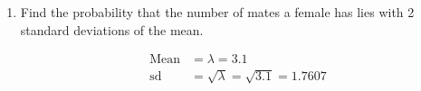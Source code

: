 \begin{enumerate}[label=(\alph*)]
        \pagebreak

        \item Find the probability that the number of mates a female has lies with 2 standard deviations of the mean.
        \\
        \begin{mdframed}
            \begin{align*}
                \text{Mean} & = \lambda = 3.1                       \\
                \text{sd}   & = \sqrt{\lambda} = \sqrt{3.1} = 1.7607
            \end{align*}
        \end{mdframed}
    \end{enumerate}
